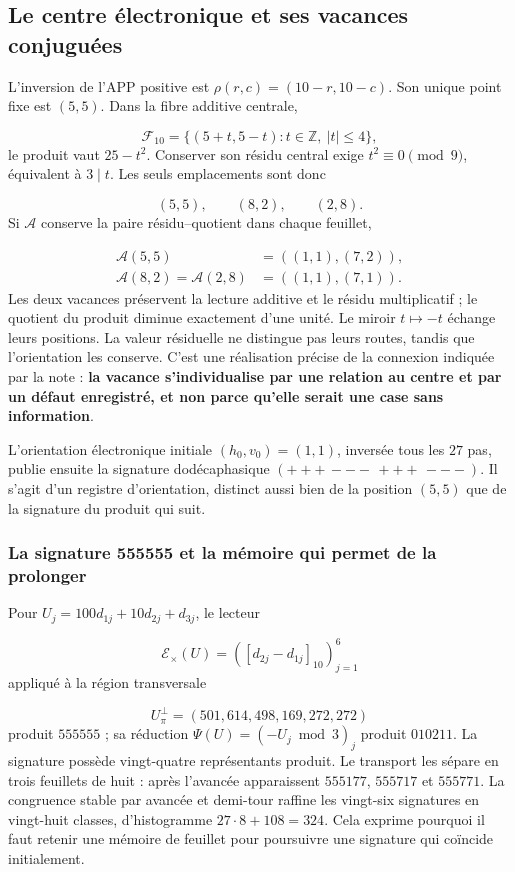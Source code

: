 \subsection{Le centre électronique et ses vacances conjuguées}
L'inversion de l'APP positive est \(\rho(r,c)=(10-r,10-c)\). Son unique point fixe est \((5,5)\). Dans la fibre additive centrale,

\[
\mathcal F_{10}=\{(5+t,5-t):t\in\mathbb Z,\ |t|\leq4\},
\]
le produit vaut \(25-t^2\). Conserver son résidu central exige \(t^2\equiv0\pmod9\), équivalent à \(3\mid t\). Les seuls emplacements sont donc

\[
(5,5),\qquad(8,2),\qquad(2,8).
\]
Si \(\mathcal A\) conserve la paire résidu–quotient dans chaque feuillet,

\[
\begin{aligned}
\mathcal A(5,5)&=((1,1),(7,2)),\\
\mathcal A(8,2)=\mathcal A(2,8)&=((1,1),(7,1)).
\end{aligned}
\]
Les deux vacances préservent la lecture additive et le résidu multiplicatif ; le quotient du produit diminue exactement d'une unité. Le miroir \(t\mapsto-t\) échange leurs positions. La valeur résiduelle ne distingue pas leurs routes, tandis que l'orientation les conserve. C'est une réalisation précise de la connexion indiquée par la note : \textbf{la vacance s'individualise par une relation au centre et par un défaut enregistré, et non parce qu'elle serait une case sans information}.

L'orientation électronique initiale \((h_0,v_0)=(1,1)\), inversée tous les \(27\) pas, publie ensuite la signature dodécaphasique \((+++\,---\,+++\,---)\). Il s'agit d'un registre d'orientation, distinct aussi bien de la position \((5,5)\) que de la signature du produit qui suit.

\subsubsection*{La signature 555555 et la mémoire qui permet de la prolonger}
Pour \(U_j=100d_{1j}+10d_{2j}+d_{3j}\), le lecteur

\[
\mathcal E_\times(U)=([d_{2j}-d_{1j}]_{10})_{j=1}^{6}
\]
appliqué à la région transversale

\[
U_\pi^\perp=(501,614,498,169,272,272)
\]
produit \(555555\) ; sa réduction \(\Psi(U)=(-U_j\bmod3)_j\) produit \(010211\). La signature possède vingt-quatre représentants produit. Le transport les sépare en trois feuillets de huit : après l'avancée apparaissent \(555177\), \(555717\) et \(555771\). La congruence stable par avancée et demi-tour raffine les vingt-six signatures en vingt-huit classes, d'histogramme \(27\cdot8+108=324\). Cela exprime pourquoi il faut retenir une mémoire de feuillet pour poursuivre une signature qui coïncide initialement.


